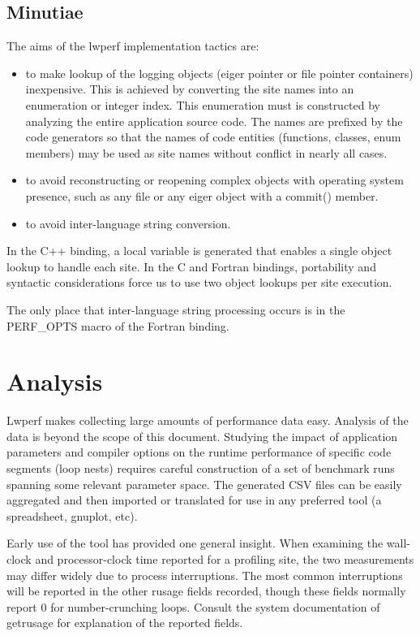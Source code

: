 \documentclass{article}
\begin{document}
\subsection{Minutiae}
The aims of the lwperf implementation tactics are:
\begin{itemize}
\item to make lookup of the logging objects (eiger pointer or file pointer containers) inexpensive. This is achieved by converting the site names into an enumeration or integer index. This enumeration must is constructed by analyzing the entire application source code. The names are prefixed by the code generators so that the names of code entities (functions, classes, enum members) may be used as site names without conflict in nearly all cases.

\item to avoid reconstructing or reopening complex objects with operating system presence, such as any file or any eiger object with a commit() member.
\item to avoid inter-language string conversion.
\end{itemize}

In the C++ binding, a local variable is generated that enables a single object lookup to handle each site. In the C and Fortran bindings, portability and syntactic considerations force us to use two object lookups per site execution.

The only place that inter-language string processing occurs is in the PERF\_OPTS macro of the Fortran binding.

\section{Analysis}
Lwperf makes collecting large amounts of performance data easy. Analysis of the data is beyond the scope of this document. Studying the impact of application parameters and compiler options on the runtime performance of specific code segments (loop nests) requires careful construction of a set of benchmark runs spanning some relevant parameter space. The generated CSV files can be easily aggregated and then imported or translated for use in any preferred tool (a spreadsheet, gnuplot, etc).

Early use of the tool has provided one general insight. When examining the wall-clock and processor-clock time reported for a profiling site, the two measurements may differ widely due to process interruptions. The most common interruptions will be reported in the other rusage fields recorded, though these fields normally report 0 for number-crunching loops. Consult the system documentation of getrusage for explanation of the reported fields.
\end{document}
